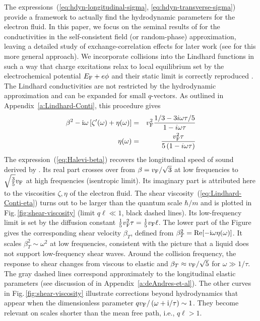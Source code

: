 \documentclass[11pt, oneside]{article}   	%
\begin{document}
The expressions~(\ref{eq:hdyn-longitudinal-sigma}, \ref{eq:hdyn-transverse-sigma})
provide a framework to actually find the hydrodynamic parameters 
for the electron fluid. In this paper, we focus on the seminal results of
\citet{Lindhard_1954} for the conductivities in the self-consistent field (or
random-phase) approximation, leaving a detailed study of exchange-correlation
effects for later work (see \citet{Conti_1999} for this more general approach).
We incorporate collisions into the Lindhard functions in such a way that
charge excitations relax to local equilibrium set by the electrochemical potential
$E_{\rm F} + e \phi$ and their static limit is correctly reproduced
\citep{Kliewer_1969a, Mermin_1970, Conti_1999}. 
The Lindhard conductivities
are not restricted by the hydrodynamic approximation and can be expanded for 
small $q$-vectors. As outlined in Appendix~\ref{a:Lindhard-Conti}, this procedure gives
\begin{eqnarray}
\beta^2 - {\rm i} \omega \left[\zeta'(\omega) + \eta(\omega)\right]
&=& v_{\rm F}^2 
\frac{1/3 - 3i\omega \tau/5}{1 - i\omega \tau} 
\label{eq:Halevi-beta}\\
\eta(\omega) &=& 
\frac{v_{\rm F}^2 \tau}{5 \left( 1 - i\omega \tau \right)} 
\label{eq:Lindhard-Conti-eta}
\end{eqnarray}
The expression~(\ref{eq:Halevi-beta}) recovers the longitudinal speed of sound 
derived by \citet{Halevi_1995}. 
Its real part crosses over from $\beta = v_{\rm F}/\sqrt{3}$ at low
frequencies to $\sqrt{\frac35} v_{\rm F}$ at high frequencies (isentropic limit).
Its imaginary part is attributed here to the viscosities $\zeta, \eta$ of the electron fluid.
The shear viscosity~(\ref{eq:Lindhard-Conti-eta}) 
turns out to be larger than the quantum scale $\hbar/m$
and is plotted in Fig.\,\ref{fig:shear-viscosity} (limit $q \ell \ll 1$, black dashed lines).
Its low-frequency limit is set by the diffusion constant $\tfrac15 v_{\rm F}^2 \tau 
= \tfrac15 v_{\rm F} \ell$.
The lower part of the Figure gives the corresponding shear velocity $\beta_T$, defined from
$\beta_T^2 = \mathop{\rm Re}[-{\rm i}\omega \eta(\omega)]$.
It scales $\beta_{T}^2 \sim \omega^2$ at low frequencies, 
consistent with the picture that a liquid does not support low-frequency shear waves.
Around the collision frequency, the response to shear changes from viscous to elastic
and $\beta_{T} \approx v_{\rm F}/\sqrt{5}$ for $\omega \gg 1/\tau$.
The gray dashed lines correspond approximately to the longitudinal elastic parameters 
(see discussion
of \citet{deAndres_1986} in Appendix~\ref{a:deAndres-et-al}).
The other curves in Fig.\,\ref{fig:shear-viscosity} illustrate corrections beyond 
hydrodynamics that appear when the dimensionless 
parameter $q v_{\rm F} / \left( \omega + {\rm i}/\tau \right) \sim 1$. They become relevant
on scales shorter than the mean free path, i.e., $q \ell > 1$.
\end{document}

